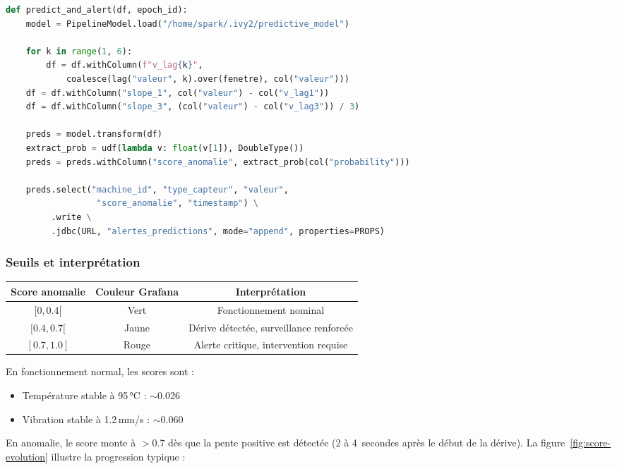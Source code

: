 \documentclass[12pt,a4paper]{article}
\begin{document}
\begin{lstlisting}[language=Python,caption={Fonction d'inference temps reel}]
def predict_and_alert(df, epoch_id):
    model = PipelineModel.load("/home/spark/.ivy2/predictive_model")

    for k in range(1, 6):
        df = df.withColumn(f"v_lag{k}",
            coalesce(lag("valeur", k).over(fenetre), col("valeur")))
    df = df.withColumn("slope_1", col("valeur") - col("v_lag1"))
    df = df.withColumn("slope_3", (col("valeur") - col("v_lag3")) / 3)

    preds = model.transform(df)
    extract_prob = udf(lambda v: float(v[1]), DoubleType())
    preds = preds.withColumn("score_anomalie", extract_prob(col("probability")))

    preds.select("machine_id", "type_capteur", "valeur",
                  "score_anomalie", "timestamp") \
         .write \
         .jdbc(URL, "alertes_predictions", mode="append", properties=PROPS)
\end{lstlisting}

\subsubsection{Seuils et interprétation}

\begin{center}
\begin{tabular}{|c|c|c|}
\hline
\textbf{Score anomalie} & \textbf{Couleur Grafana} & \textbf{Interprétation} \\
\hline
$[0, 0.4[$ & Vert & Fonctionnement nominal \\
$[0.4, 0.7[$ & Jaune & Dérive détectée, surveillance renforcée \\
$[0.7, 1.0]$ & Rouge & Alerte critique, intervention requise \\
\hline
\end{tabular}
\end{center}

En fonctionnement normal, les scores sont :
\begin{itemize}
    \item Température stable à 95\,°C : $\sim$0.026
    \item Vibration stable à 1.2\,mm/s : $\sim$0.060
\end{itemize}

En anomalie, le score monte à $>$0.7 dès que la pente positive est détectée (2 à 4~secondes après le début de la dérive). La figure~\ref{fig:score-evolution} illustre la progression typique :
\end{document}
